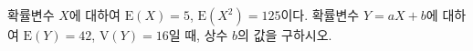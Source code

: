 확률변수 $X$에 대하여 $\mathrm{E}(X)=5$, $\mathrm{E}(X^2)=125$이다. 확률변수 $Y=aX+b$에 대하여 $\mathrm{E}(Y)=42$, $\mathrm{V}(Y)=16$일 때, 상수 $b$의 값을 구하시오. 
